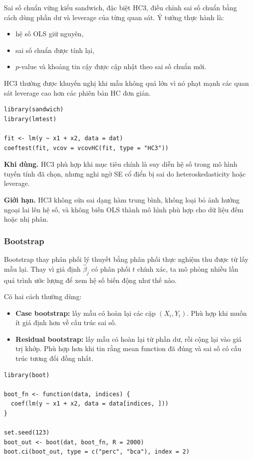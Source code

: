 Sai số chuẩn vững kiểu sandwich, đặc biệt HC3, điều chỉnh sai số chuẩn bằng cách dùng phần dư và leverage của từng quan sát. Ý tưởng thực hành là:
\begin{itemize}
  \item hệ số OLS giữ nguyên,
  \item sai số chuẩn được tính lại,
  \item $p$-value và khoảng tin cậy được cập nhật theo sai số chuẩn mới.
\end{itemize}

HC3 thường được khuyến nghị khi mẫu không quá lớn vì nó phạt mạnh các quan sát leverage cao hơn các phiên bản HC đơn giản.

\begin{lstlisting}[style=Rstyle]
library(sandwich)
library(lmtest)

fit <- lm(y ~ x1 + x2, data = dat)
coeftest(fit, vcov = vcovHC(fit, type = "HC3"))
\end{lstlisting}

\textbf{Khi dùng.} HC3 phù hợp khi mục tiêu chính là suy diễn hệ số trong mô hình tuyến tính đã chọn, nhưng nghi ngờ SE cổ điển bị sai do heteroskedasticity hoặc leverage.

\textbf{Giới hạn.} HC3 không sửa sai dạng hàm trung bình, không loại bỏ ảnh hưởng ngoại lai lên hệ số, và không biến OLS thành mô hình phù hợp cho dữ liệu đếm hoặc nhị phân.

\subsubsection{Bootstrap}

Bootstrap thay phân phối lý thuyết bằng phân phối thực nghiệm thu được từ lấy mẫu lại. Thay vì giả định $\hat{\beta}_j$ có phân phối $t$ chính xác, ta mô phỏng nhiều lần quá trình ước lượng để xem hệ số biến động như thế nào.

Có hai cách thường dùng:
\begin{itemize}
  \item \textbf{Case bootstrap:} lấy mẫu có hoàn lại các cặp $(X_i, Y_i)$. Phù hợp khi muốn ít giả định hơn về cấu trúc sai số.
  \item \textbf{Residual bootstrap:} lấy mẫu có hoàn lại từ phần dư, rồi cộng lại vào giá trị khớp. Phù hợp hơn khi tin rằng mean function đã đúng và sai số có cấu trúc tương đối đồng nhất.
\end{itemize}

\begin{lstlisting}[style=Rstyle]
library(boot)

boot_fn <- function(data, indices) {
  coef(lm(y ~ x1 + x2, data = data[indices, ]))
}

set.seed(123)
boot_out <- boot(dat, boot_fn, R = 2000)
boot.ci(boot_out, type = c("perc", "bca"), index = 2)
\end{lstlisting}

